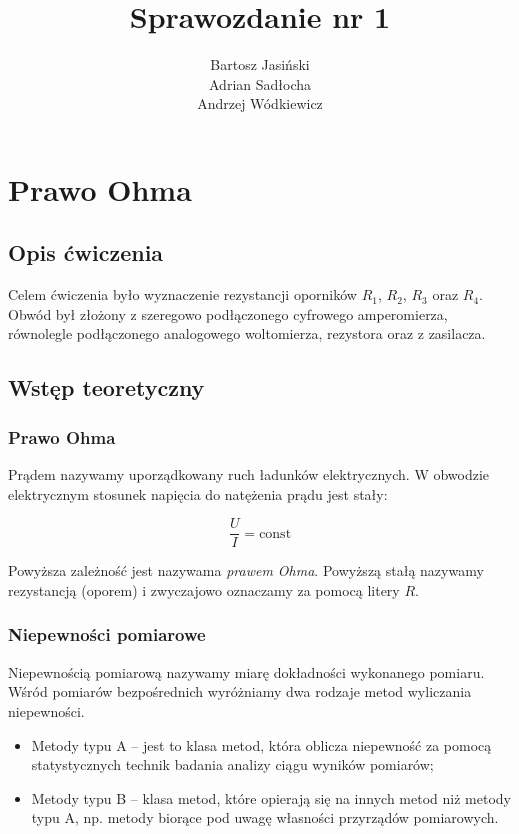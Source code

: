 \documentclass[a4paper]{article}
\title{Sprawozdanie nr 1}
\author{
Bartosz Jasiński \\
Adrian Sadłocha \\
Andrzej Wódkiewicz
}
\begin{document}
\maketitle
\setcounter{secnumdepth}{2}
\setcounter{tocdepth}{2}

\section{Prawo Ohma}

\subsection{Opis ćwiczenia}

Celem ćwiczenia było wyznaczenie rezystancji oporników $R_1$, $R_2$, $R_3$ oraz $R_4$.
Obwód był złożony z szeregowo podłączonego cyfrowego amperomierza, równolegle podłączonego analogowego woltomierza, rezystora oraz z zasilacza.

\subsection{Wstęp teoretyczny}

\subsubsection{Prawo Ohma}

Prądem nazywamy uporządkowany ruch ładunków elektrycznych.
W obwodzie elektrycznym stosunek napięcia do natężenia prądu jest stały:

$$\frac{U}{I} = \text{const}$$

Powyższa zależność jest nazywama \textit{prawem Ohma}. Powyższą stałą nazywamy rezystancją (oporem) i zwyczajowo oznaczamy za pomocą litery $R$.

\subsubsection{Niepewności pomiarowe}

Niepewnością pomiarową nazywamy miarę dokładności wykonanego pomiaru.
Wśród pomiarów bezpośrednich wyróżniamy dwa rodzaje metod wyliczania niepewności.

\begin{itemize}
\item Metody typu A -- jest to klasa metod, która oblicza niepewność za pomocą statystycznych technik badania analizy ciągu wyników pomiarów;
\item Metody typu B -- klasa metod, które opierają się na innych metod niż metody typu A, np. metody biorące pod uwagę własności przyrządów pomiarowych.
\end{itemize}
\end{document}

